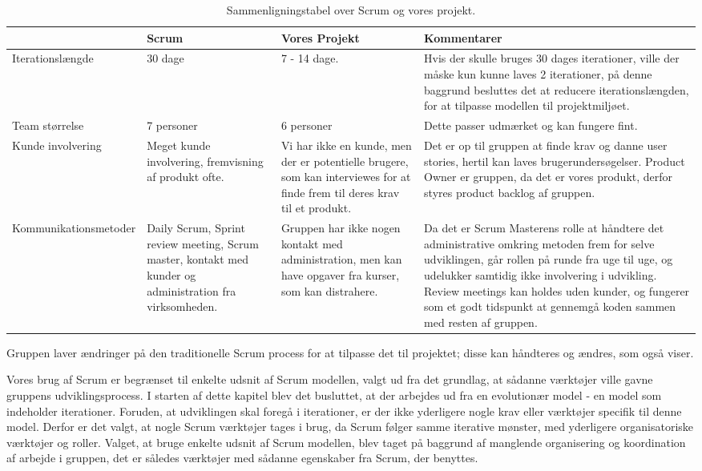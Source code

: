 \begin{sidewaystable}
      \begin{tabular}{p{5cm}p{5cm}p{5cm}p{5cm}}
	       				 & Scrum  & Vores Projekt & Kommentarer  \\ \hline

	   Iterationslængde  		
	   		& 30 dage 
	   		& 7 - 14 dage. 
	   		& Hvis der skulle bruges 30 dages iterationer, ville der måske kun kunne laves 2 iterationer, på denne baggrund besluttes det at reducere iterationslængden, for at tilpasse modellen til projektmiljøet.\\
	   		
	   Team størrelse    		
	   		& 7 personer
	   		& 6 personer 
	   		& Dette passer udmærket og kan fungere fint. \\
	   		
	   Kunde involvering 		
	   		& Meget kunde involvering, fremvisning af produkt ofte.
	   		& Vi har ikke en kunde, men der er potentielle brugere, som kan interviewes for at finde frem til deres krav til et produkt.
	   		& Det er op til gruppen at finde krav og danne user stories, hertil kan laves brugerundersøgelser. Product Owner er gruppen, da det er vores produkt, derfor styres product backlog af gruppen.\\
	   		
	   Kommunikationsmetoder	
	   		& Daily Scrum, Sprint review meeting, Scrum master, kontakt med kunder og administration fra virksomheden.
	   		& Gruppen har ikke nogen kontakt med administration, men kan have opgaver fra kurser, som kan distrahere. 
	   		& Da det er Scrum Masterens rolle at håndtere det administrative omkring metoden frem for selve udviklingen, går rollen på runde fra uge til uge, og udelukker samtidig ikke involvering i udvikling. Review meetings kan holdes uden kunder, og fungerer som et godt tidspunkt at gennemgå koden sammen med resten af gruppen. \\
    \end{tabular}
  \caption{Sammenligningstabel over Scrum og vores projekt.}\label{tabel:sammenligningstabel}
\end{sidewaystable}

Gruppen laver ændringer på den traditionelle Scrum process for at tilpasse det til projektet; disse kan håndteres og ændres, som  også viser.

Vores brug af Scrum er begrænset til enkelte udsnit af Scrum modellen, valgt ud fra det grundlag, at sådanne værktøjer ville gavne gruppens udviklingsprocess.
I starten af dette kapitel blev det busluttet, at der arbejdes ud fra en evolutionær model - en model som indeholder iterationer.
Foruden, at udviklingen skal foregå i iterationer, er der ikke yderligere nogle krav eller værktøjer specifik til denne model.
Derfor er det valgt, at nogle Scrum værktøjer tages i brug, da Scrum følger samme iterative mønster, med yderligere organisatoriske værktøjer og roller.
Valget, at bruge enkelte udsnit af Scrum modellen, blev taget på baggrund af manglende organisering og koordination af arbejde i gruppen, det er således værktøjer med sådanne egenskaber fra Scrum, der benyttes.

